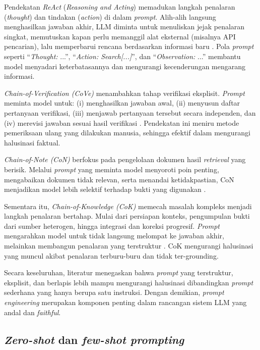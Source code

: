 Pendekatan \textit{ReAct} (\textit{Reasoning and Acting}) memadukan langkah penalaran (\textit{thought}) dan tindakan (\textit{action}) di dalam \textit{prompt}. Alih-alih langsung menghasilkan jawaban akhir, LLM diminta untuk menuliskan jejak penalaran singkat, memutuskan kapan perlu memanggil alat eksternal (misalnya API pencarian), lalu memperbarui rencana berdasarkan informasi baru \parencite{yao2022react}. Pola \textit{prompt} seperti ``\textit{Thought:} ...'', ``\textit{Action: Search[...]}'', dan ``\textit{Observation:} ...'' membantu model menyadari keterbatasannya dan mengurangi kecenderungan mengarang informasi.

\textit{Chain-of-Verification (CoVe)} menambahkan tahap verifikasi eksplisit. \textit{Prompt} meminta model untuk: (i) menghasilkan jawaban awal, (ii) menyusun daftar pertanyaan verifikasi, (iii) menjawab pertanyaan tersebut secara independen, dan (iv) merevisi jawaban sesuai hasil verifikasi \parencite{dhuliawala2024cove}. Pendekatan ini meniru metode pemeriksaan ulang yang dilakukan manusia, sehingga efektif dalam mengurangi halusinasi faktual.

\textit{Chain-of-Note (CoN)} berfokus pada pengelolaan dokumen hasil \textit{retrieval} yang berisik. Melalui \textit{prompt} yang meminta model menyoroti poin penting, mengabaikan dokumen tidak relevan, serta menandai ketidakpastian, CoN menjadikan model lebih selektif terhadap bukti yang digunakan \parencite{yu2024con}.

Sementara itu, \textit{Chain-of-Knowledge (CoK)} memecah masalah kompleks menjadi langkah penalaran bertahap. Mulai dari persiapan konteks, pengumpulan bukti dari sumber heterogen, hingga integrasi dan koreksi progresif. \textit{Prompt} mengarahkan model untuk tidak langsung melompat ke jawaban akhir, melainkan membangun penalaran yang terstruktur \parencite{li2023cok}. CoK mengurangi halusinasi yang muncul akibat penalaran terburu-buru dan tidak ter-grounding.

Secara keseluruhan, literatur menegaskan bahwa \textit{prompt} yang terstruktur, eksplisit, dan berlapis lebih mampu mengurangi halusinasi dibandingkan \textit{prompt} sederhana yang hanya berupa satu instruksi. Dengan demikian, \textit{prompt engineering} merupakan komponen penting dalam rancangan sistem LLM yang andal dan \textit{faithful}.


\subsection{\textit{Zero-shot} dan \textit{few-shot prompting}}
\label{subsec:zerofewshot}

